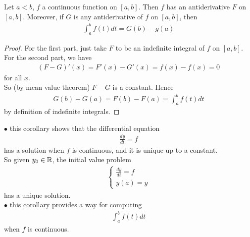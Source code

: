 \documentclass[a4paper]{article}
\begin{document}
\begin{coro}
Let $a<b$, $f$ a continuous function on $\left[a,b\right]$. Then $f$ has an antiderivative $F$ on $\left[a,b\right]$. Moreover, if $G$ is any antiderivative of $f$ on $\left[a,b\right]$, then
\begin{equation*}
\begin{aligned}
\int_a^b f\left(t\right)dt = G\left(b\right) - g\left(a\right)
\end{aligned}
\end{equation*}
\begin{proof}
For the first part, just take $F$ to be an indefinite integral of $f$ on $\left[a,b\right]$.\\
For the second part, we have
\begin{equation*}
\begin{aligned}
\left(F-G\right)'\left(x\right) = F'\left(x\right) - G'\left(x\right) = f\left(x\right) - f\left(x\right) = 0
\end{aligned}
\end{equation*}
for all $x$.\\
So (by mean value theorem) $F-G$ is a constant. Hence
\begin{equation*}
\begin{aligned}
G\left(b\right) - G\left(a\right) = F\left(b\right) - F\left(a\right) = \int_a^b f\left(t\right) dt
\end{aligned}
\end{equation*}
by definition of indefinite integrals.
\end{proof}
\end{coro}

\begin{rem}
$\bullet$ this corollary shows that the differential equation
\begin{equation*}
\begin{aligned}
\frac{dy}{dt}=f
\end{aligned}
\end{equation*}
has a solution when $f$ is continuous, and it is unique up to a constant.\\
So given $y_0\in \mathbb{R}$, the initial value problem
\begin{equation*}
\begin{aligned}
\left\{\begin{array}{ll}
\frac{dy}{dt}=f\\
y\left(a\right) = y
\end{array}
\right.
\end{aligned}
\end{equation*}
has a unique solution.\\
$\bullet$ this corollary provides a way for computing
\begin{equation*}
\begin{aligned}
\int_a^b f\left(t\right) dt
\end{aligned}
\end{equation*}
when $f$ is continuous.
\end{rem}
\end{document}
